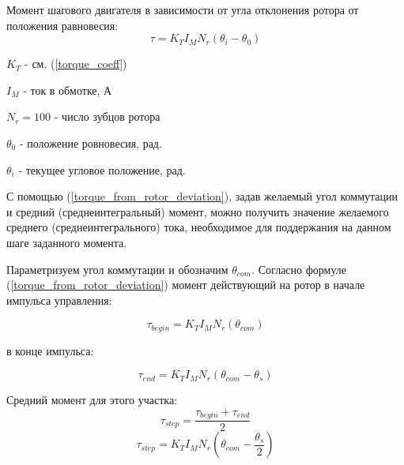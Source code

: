 Момент шагового двигателя в зависимости от угла отклонения ротора от положения равновесия:
\begin{equation}
    \label{torque_from_rotor_deviation}
    \tau = K_{T} I_{M} N_{r} ( \theta_{i} - \theta_{0} )
\end{equation}

$K_{T}$ - см. (\ref{torque_coeff})

$I_{M}$ - ток в обмотке, А

$N_{r} = 100$ - число зубцов ротора

$\theta_{0}$ - положение ровновесия, рад.

$\theta_{i}$ - текущее угловое положение, рад.
\newline
\newline

С помощью (\ref{torque_from_rotor_deviation}), задав желаемый угол коммутации и
средний (среднеинтегральный) момент, можно получить значение желаемого среднего
(среднеинтегрального) тока, необходимое для поддержания на данном шаге заданного момента.

Параметризуем угол коммутации и обозначим
$\theta_{com}$.
Согласно формуле (\ref{torque_from_rotor_deviation}) момент действующий на ротор
в начале импульса управления:

\begin{equation}
    \label{moment_to_rotor_at_the_begin_of_control_pulse}
    \tau_{begin} = K_{T} I_{M} N_{r} ( \theta_{com} )
\end{equation}

в конце импульса:

\begin{equation}
    \label{moment_to_rotor_at_the_end_of_control_pulse}
    \tau_{end} = K_{T} I_{M} N_{r} ( \theta_{com} - \theta_{s} )
\end{equation}

Средний момент для этого участка:
$$
    \tau_{step} = \frac{ \tau_{begin} + \tau_{end} }{ 2 }
$$
$$
    \tau_{step} = K_{T} I_{M} N_{r} ( \theta_{com} - \frac{ \theta_{s} }{ 2 } )
$$

